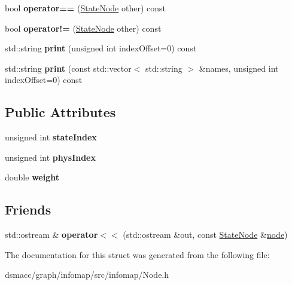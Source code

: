 \begin{DoxyCompactItemize}
\mbox{\label{structStateNode_a734a934154f15fa4625790a8f9422259}} 
bool {\bfseries operator==} (\mbox{\hyperlink{structStateNode}{State\+Node}} other) const
\item 
\mbox{\label{structStateNode_a3cc22196dc24848db4c7bda293f3408c}} 
bool {\bfseries operator!=} (\mbox{\hyperlink{structStateNode}{State\+Node}} other) const
\item 
\mbox{\label{structStateNode_acc81a5a7240c4cace9525f1169fae1db}} 
std\+::string {\bfseries print} (unsigned int index\+Offset=0) const
\item 
\mbox{\label{structStateNode_a4efe2dde52d5a99d4626a45bf9fc197b}} 
std\+::string {\bfseries print} (const std\+::vector$<$ std\+::string $>$ \&names, unsigned int index\+Offset=0) const
\end{DoxyCompactItemize}
\subsection*{Public Attributes}
\begin{DoxyCompactItemize}
\item 
\mbox{\label{structStateNode_adc8e116ee619a3607d1f2f4cb4fbdddb}} 
unsigned int {\bfseries state\+Index}
\item 
\mbox{\label{structStateNode_afe1fe11ee8f042823617d17413358c37}} 
unsigned int {\bfseries phys\+Index}
\item 
\mbox{\label{structStateNode_a832a3a62462f2e3b7da5cddf20e010e0}} 
double {\bfseries weight}
\end{DoxyCompactItemize}
\subsection*{Friends}
\begin{DoxyCompactItemize}
\item 
\mbox{\label{structStateNode_a427aecb301afe5ce4e9de2d6238e5e1d}} 
std\+::ostream \& {\bfseries operator$<$$<$} (std\+::ostream \&out, const \mbox{\hyperlink{structStateNode}{State\+Node}} \&\mbox{\hyperlink{structnode}{node}})
\end{DoxyCompactItemize}


The documentation for this struct was generated from the following file\+:\begin{DoxyCompactItemize}
\item 
dsmacc/graph/infomap/src/infomap/Node.\+h\end{DoxyCompactItemize}
